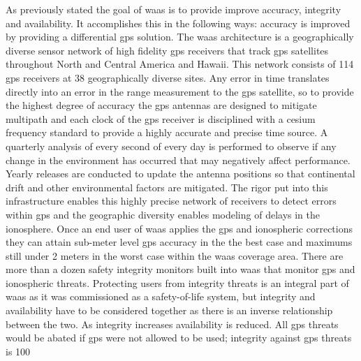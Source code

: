 As previously stated the goal of \ac{waas} is to provide improve accuracy, integrity and availability. It accomplishes this in the following ways: accuracy is improved by providing a differential \ac{gps} solution. The \ac{waas} architecture is a geographically diverse sensor network of high fidelity \ac{gps} receivers that track \ac{gps} satellites throughout North and Central America and Hawaii. This network consists of 114 \ac{gps} receivers at 38 geographically diverse sites.  Any error in time translates directly into an error in the range measurement to the \ac{gps} satellite, so to provide the highest degree of accuracy the \ac{gps} antennas are designed to mitigate multipath and each clock of the \ac{gps} receiver is disciplined with a cesium frequency standard to provide a highly accurate and precise time source. A quarterly analysis of every second of every day is performed to observe if any change in the environment has occurred that may negatively affect performance. Yearly releases are conducted to update the antenna positions so that continental drift and other environmental factors are mitigated. The rigor put into this infrastructure enables this highly precise network of receivers to detect errors within \ac{gps} and the geographic diversity enables modeling of delays in the ionosphere. Once an end user of \ac{waas} applies the \ac{gps} and ionospheric corrections they can attain sub-meter level \ac{gps} accuracy in the the best case and maximums still under 2 meters in the worst case within the \ac{waas} coverage area. There are more than a dozen safety integrity monitors built into \ac{waas} that monitor \ac{gps} and ionospheric threats. Protecting users from integrity threats is an integral part of \ac{waas} as it was commissioned as a safety-of-life system, but integrity and availability have to be considered together as there is an inverse relationship between the two. As integrity increases availability is reduced. All \ac{gps} threats would be abated if \ac{gps} were not allowed to be used; integrity against \ac{gps} threats is 100%

